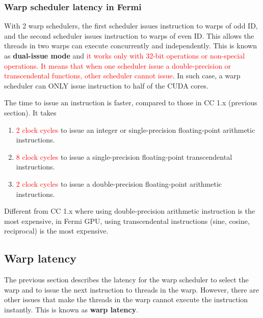 \subsubsection{Warp scheduler latency in Fermi}
\label{sec:warp-scheduler-fermi}

With 2 warp schedulers, the first scheduler issues instruction to
warps of odd ID, and the second scheduler issues instruction to warps
of even ID. This allows the threads in two warps can execute
concurrently and independently.  This is known as
{\bf dual-issue mode} and
\textcolor{red}{it works only with 32-bit operations or non-special
  operations. It means that when one scheduler issue a
  double-precision or transcendental functions, other scheduler cannot
  issue}.
In such case, a warp scheduler can ONLY issue instruction to half of
the CUDA cores. 


The time to issue an instruction is faster, compared to those in CC
1.x (previous section). It takes
\begin{enumerate}
\item \textcolor{red}{2 clock cycles} to issue an integer or
  single-precision floating-point arithmetic instructions.

\item \textcolor{red}{8 clock cycles} to issue a single-precision
  floating-point transcendental instructions.

\item \textcolor{red}{2 clock cycles} to issue a double-precision
  floating-point arithmetic instructions.
\end{enumerate}

\begin{framed}
  Different from CC 1.x where using double-precision arithmetic
  instruction is the most expensive, in Fermi GPU, using
  transcendental instructions (sine, cosine, reciprocal) is the most
  expensive.
\end{framed}

\subsection{Warp latency}
\label{sec:warp-latency}

The previous section describes the latency for the warp scheduler to
select the warp and to issue the next instruction to threads in the
warp. However, there are other issues that make the threads in the
warp cannot execute the instruction instantly. This is known as
{\bf warp latency}.

